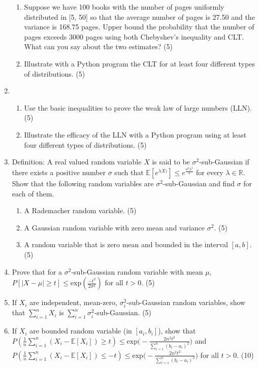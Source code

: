 \documentclass{article}
\begin{document}
\begin{enumerate}
{\begin{enumerate}
\item{Suppose we have 100 books with the number of pages uniformly distributed in [5, 50] so that the average number of pages is 27.50 and the variance is 168.75 pages. Upper bound the probability that the number of pages exceeds 3000 pages using both Chebyshev's inequality and CLT. What can you say about the two estimates? (5)}
\item{Illustrate with a Python program the CLT for at least four different types of distributions. (5)}
\end{enumerate}}
\item{\begin{enumerate}
\item{
Use the basic inequalities to prove the weak law of large numbers (LLN). (5)}
\item{Illustrate the efficacy of the LLN with a Python program using at least four different types of distributions. (5)} 
\end{enumerate}
}
\item{Definition: A real valued random variable $X$ is said to be $\sigma^2$-sub-Gaussian if there exists a positive number $\sigma$ such that $\mathbb{E}[e^{\lambda X)}]\leq e^{\frac{\sigma^2\lambda^2}{2}}$ for every $\lambda \in \mathbb{R}$. Show that the following random variables are $\sigma^2$-sub-Gaussian and find $\sigma$ for each of them.
\begin{enumerate}
\item{A Rademacher random variable. (5)}
\item{A Gaussian random variable with zero mean and variance $\sigma^2$. (5)}
\item{A random variable that is zero mean and bounded in the interval $[a, b]$. (5)}
\end{enumerate}
}
\item{Prove that for a $\sigma^2$-sub-Gaussian random variable with mean $\mu$, $P[|X - \mu| \geq t] \leq \text{exp}(\frac{-t^2}{2\sigma^2})$ for all $t > 0$. (5)}
\item{If $X_i$ are independent, mean-zero, $\sigma_i^2$-sub-Gaussian random variables, show that $\sum\limits_{i=1}^n X_i$ is $\sum\limits_{i=1}^n \sigma_i^2$-sub-Gaussian. (5)}
\item{If $X_i$ are bounded random variable (in $[a_i, b_i]$), show that  $P(\frac{1}{n}\sum\limits_{i=1}^n (X_i - \mathbb{E}[{X_i}]) \geq t) \leq \text{exp}\Big(-\frac{2n^2t^2}{\sum\limits_{i=1}^n (b_i - a_i)^2}\Big)$ and $P(\frac{1}{n}\sum\limits_{i=1}^n (X_i - \mathbb{E}[{X_i}]) \leq -t) \leq \text{exp}\Big(-\frac{2n^2t^2}{\sum\limits_{i=1}^n (b_i - a_i)^2}\Big)$  for all $t > 0$. (10)}

\end{enumerate}
\end{document}
